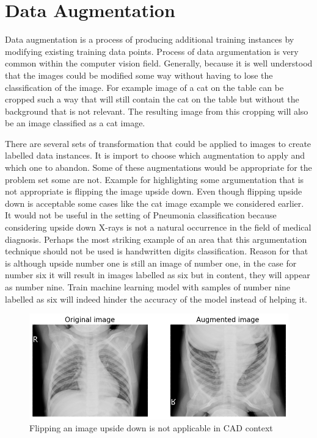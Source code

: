 \section{Data Augmentation} \label{sec:dataaug}
Data augmentation is a process of producing additional training instances by modifying existing training data points.
Process of data argumentation is very common within the computer vision field.
Generally, because it is well understood that the images could be modified some way without having to lose the classification of the image.
For example image of a cat on the table can be cropped such a way that will still contain the cat on the table but without the background that is not relevant.
The resulting image from this cropping will also be an image classified as a cat image.

There are several sets of transformation that could be applied to images to create labelled data instances. 
It is import to choose which augmentation to apply and which one to abandon.
Some of these augmentations would be appropriate for the problem set some are not.
Example for highlighting some argumentation that is not appropriate is flipping the image upside down. 
Even though flipping upside down is acceptable some cases like the cat image example we considered earlier. 
It would not be useful in the setting of Pneumonia classification because considering upside down X-rays is not a natural occurrence in the field of medical diagnosis.
Perhaps the most striking example of an area that this argumentation technique should not be used is handwritten digits classification. 
Reason for that is although upside number one is still an image of number one, in the case for number six it will result in images labelled as six but in content, they will appear as number nine. 
Train machine learning model with samples of number nine labelled as six will indeed hinder the accuracy of the model instead of helping it.

\begin{figure}[H]
    \centering
    \includegraphics[width=\textwidth]{img/augmented-image-1588951790.png}
    \caption{Flipping an image upside down is not applicable in CAD context}
    \label{fig:upsidedownxray}
  \end{figure}

